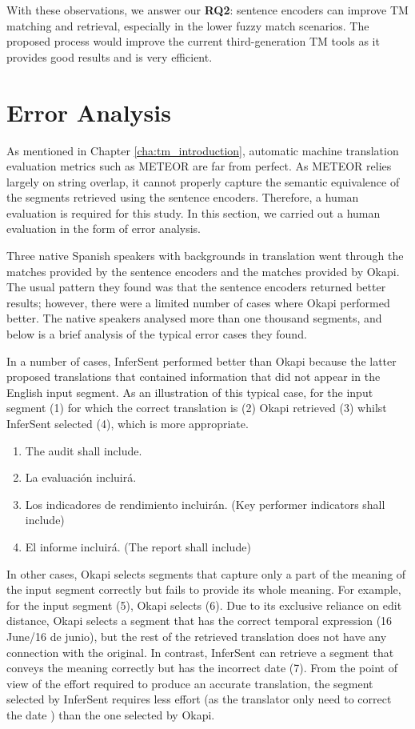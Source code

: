 With these observations, we answer our \textbf{RQ2}: sentence encoders can improve TM matching and retrieval, especially in the lower fuzzy match scenarios. The proposed process would improve the current third-generation TM tools as it provides good results and is very efficient.

\section{Error Analysis}
\label{sec:tm_sentence_encoders_error}
As mentioned in Chapter \ref{cha:tm_introduction}, automatic machine translation evaluation metrics such as METEOR are far from perfect. As METEOR relies largely on string overlap, it cannot properly capture the semantic equivalence of the segments retrieved using the sentence encoders. Therefore, a human evaluation is required for this study. In this section, we carried out a human evaluation in the form of error analysis.

Three native Spanish speakers with backgrounds in translation went through the matches provided by the sentence encoders and the matches provided by Okapi. The usual pattern they found was that the sentence encoders returned better results; however, there were a limited number of cases where Okapi performed better. The native speakers analysed more than one thousand segments, and below is a brief analysis of the typical error cases they found.

In a number of cases, InferSent performed better than Okapi because the latter proposed translations that contained information that did not appear in the English input segment. As an illustration of this typical case, for the input segment (1) for which the correct translation is (2) Okapi retrieved (3) whilst InferSent selected (4), which is more appropriate. 

\begin{enumerate}[label={(\arabic*)}]
	\item The audit shall include.
	\item La evaluación incluirá.
	\item Los indicadores de rendimiento incluirán. (Key performer indicators shall include)
	\item El informe incluirá. (The report shall include)
\end{enumerate}

In other cases, Okapi selects segments that capture only a part of the meaning of the input segment correctly but fails to provide its whole meaning. For example, for the input segment (5), Okapi selects (6). Due to its exclusive reliance on edit distance, Okapi selects a segment that has the correct temporal expression (16 June/16 de junio), but the rest of the retrieved translation does not have any connection with the original. In contrast, InferSent can retrieve a segment that conveys the meaning correctly but has the incorrect date (7). From the point of view of the effort required to produce an accurate translation, the segment selected by InferSent requires less effort (as the translator only need to correct the date ) than the one selected by Okapi. 

